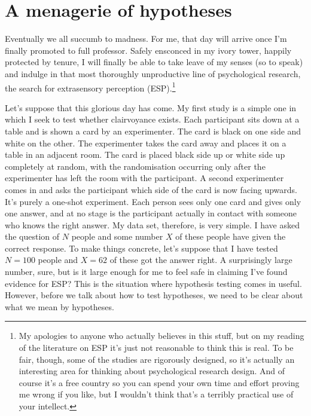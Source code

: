 \documentclass[
  a4paper,
]{book}
\begin{document}
\section{A menagerie of hypotheses}\label{a-menagerie-of-hypotheses}

Eventually we all succumb to madness. For me, that day will arrive once
I'm finally promoted to full professor. Safely ensconced in my ivory
tower, happily protected by tenure, I will finally be able to take leave
of my senses (so to speak) and indulge in that most thoroughly
unproductive line of psychological research, the search for extrasensory
perception (ESP).\footnote{My apologies to anyone who actually believes
  in this stuff, but on my reading of the literature on ESP it's just
  not reasonable to think this is real. To be fair, though, some of the
  studies are rigorously designed, so it's actually an interesting area
  for thinking about psychological research design. And of course it's a
  free country so you can spend your own time and effort proving me
  wrong if you like, but I wouldn't think that's a terribly practical
  use of your intellect.}

Let's suppose that this glorious day has come. My first study is a
simple one in which I seek to test whether clairvoyance exists. Each
participant sits down at a table and is shown a card by an experimenter.
The card is black on one side and white on the other. The experimenter
takes the card away and places it on a table in an adjacent room. The
card is placed black side up or white side up completely at random, with
the randomisation occurring only after the experimenter has left the
room with the participant. A second experimenter comes in and asks the
participant which side of the card is now facing upwards. It's purely a
one-shot experiment. Each person sees only one card and gives only one
answer, and at no stage is the participant actually in contact with
someone who knows the right answer. My data set, therefore, is very
simple. I have asked the question of \(N\) people and some number \(X\)
of these people have given the correct response. To make things
concrete, let's suppose that I have tested \(N = 100\) people and
\(X = 62\) of these got the answer right. A surprisingly large number,
sure, but is it large enough for me to feel safe in claiming I've found
evidence for ESP? This is the situation where hypothesis testing comes
in useful. However, before we talk about how to test hypotheses, we need
to be clear about what we mean by hypotheses.
\end{document}
